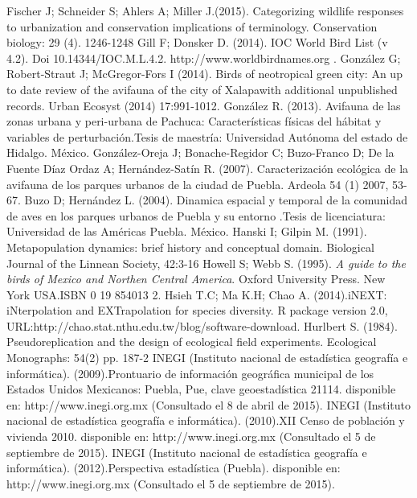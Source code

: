 \documentclass[letterpaper,12pt]{article}
\begin{document}
\begin{thebibliography}{37}
\bibitem{}Fischer J; Schneider S; Ahlers A; Miller J.(2015). Categorizing wildlife responses to urbanization and conservation implications of terminology. Conservation biology: 29 (4). 1246-1248
Gill F; Donsker D. (2014). IOC World Bird List (v 4.2). Doi 10.14344/IOC.M.L.4.2. http://www.worldbirdnames.org .
González G; Robert-Straut J; McGregor-Fors I (2014). Birds of neotropical green city: An up to date review of the avifauna of the city of Xalapawith additional unpublished records. Urban Ecosyst (2014) 17:991-1012. 
González R. (2013). Avifauna de las zonas urbana y peri-urbana de Pachuca: Características físicas del hábitat y variables de perturbación.Tesis de maestría: Universidad Autónoma del estado de Hidalgo. México.
\bibitem{}González-Oreja J; Bonache-Regidor C; Buzo-Franco D; De la Fuente Díaz Ordaz A; Hernández-Satín R. (2007). Caracterización ecológica de la avifauna de los parques urbanos de la ciudad de Puebla. Ardeola 54 (1) 2007, 53-67.
Buzo D; Hernández L. (2004). Dinamica espacial y temporal de la comunidad de aves en los parques urbanos de Puebla y su entorno .Tesis de licenciatura: Universidad de las Américas Puebla. México.
\bibitem{}Hanski I; Gilpin M. (1991). Metapopulation dynamics: brief history and conceptual domain. Biological Journal of the Linnean Society, 42:3-16
Howell S; Webb S. (1995).\textit{ A guide to the birds of Mexico and Northen Central America}. Oxford University Press. New York USA.ISBN 0 19 854013 2.
Hsieh T.C; Ma K.H; Chao A. (2014).iNEXT: iNterpolation and EXTrapolation for species diversity. R package version 2.0, URL:http://chao.stat.nthu.edu.tw/blog/software-download.
\bibitem{}Hurlbert S. (1984). Pseudoreplication and the design of ecological field experiments. Ecological Monographs: 54(2) pp. 187-2 
INEGI (Instituto nacional de estadística geografía e informática). (2009).Prontuario de información geográfica municipal de los Estados Unidos Mexicanos: Puebla, Pue, clave geoestadística 21114. disponible en: http://www.inegi.org.mx (Consultado el 8 de abril de 2015).
INEGI (Instituto nacional de estadística geografía e informática). (2010).XII Censo de población y vivienda 2010. disponible en: http://www.inegi.org.mx (Consultado el 5 de septiembre de 2015).
INEGI (Instituto nacional de estadística geografía e informática). (2012).Perspectiva estadística (Puebla). disponible en: http://www.inegi.org.mx (Consultado el 5 de septiembre de 2015).

\end{thebibliography}
\end{document}
